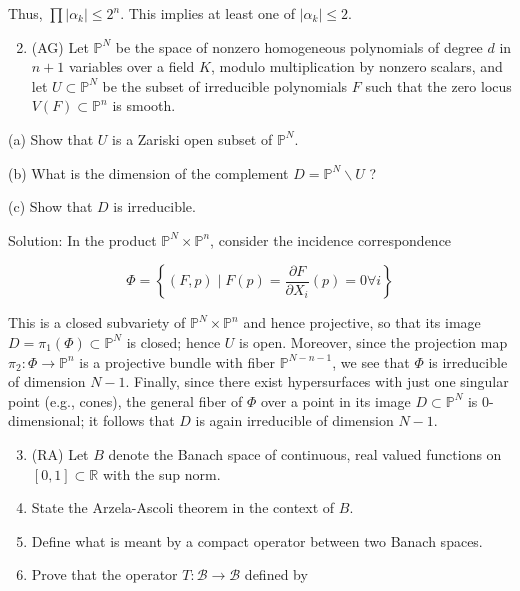 \documentclass[10pt]{article}
\begin{document}
Thus, $\prod\left|\alpha_{k}\right| \leq 2^{n}$. This implies at least one of $\left|\alpha_{k}\right| \leq 2$.

\begin{enumerate}
  \setcounter{enumi}{1}
  \item (AG) Let $\mathbb{P}^{N}$ be the space of nonzero homogeneous polynomials of degree $d$ in $n+1$ variables over a field $K$, modulo multiplication by nonzero scalars, and let $U \subset \mathbb{P}^{N}$ be the subset of irreducible polynomials $F$ such that the zero locus $V(F) \subset \mathbb{P}^{n}$ is smooth.
\end{enumerate}

(a) Show that $U$ is a Zariski open subset of $\mathbb{P}^{N}$.

(b) What is the dimension of the complement $D=\mathbb{P}^{N} \backslash U$ ?

(c) Show that $D$ is irreducible.

Solution: In the product $\mathbb{P}^{N} \times \mathbb{P}^{n}$, consider the incidence correspondence

$$
\Phi=\left\{(F, p) \mid F(p)=\frac{\partial F}{\partial X_{i}}(p)=0 \forall i\right\}
$$

This is a closed subvariety of $\mathbb{P}^{N} \times \mathbb{P}^{n}$ and hence projective, so that its image $D=\pi_{1}(\Phi) \subset \mathbb{P}^{N}$ is closed; hence $U$ is open. Moreover, since the projection map $\pi_{2}: \Phi \rightarrow \mathbb{P}^{n}$ is a projective bundle with fiber $\mathbb{P}^{N-n-1}$, we see that $\Phi$ is
irreducible of dimension $N-1$. Finally, since there exist hypersurfaces with just one singular point (e.g., cones), the general fiber of $\Phi$ over a point in its image $D \subset \mathbb{P}^{N}$ is 0-dimensional; it follows that $D$ is again irreducible of dimension $N-1$.

\begin{enumerate}
  \setcounter{enumi}{2}
  \item (RA) Let $B$ denote the Banach space of continuous, real valued functions on $[0,1] \subset \mathbb{R}$ with the sup norm.

  \item State the Arzela-Ascoli theorem in the context of $B$.

  \item Define what is meant by a compact operator between two Banach spaces.

  \item Prove that the operator $T: \mathcal{B} \rightarrow \mathcal{B}$ defined by

\end{enumerate}
\end{document}
